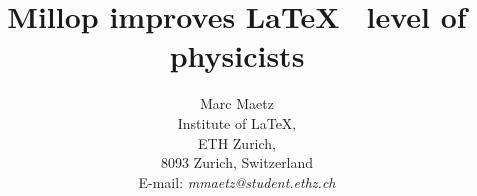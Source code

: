 \documentclass[a5paper]{book}
\title{Millop improves \LaTeX~ level of physicists}
\author{Marc Maetz\\
  Institute of \LaTeX, \\ 
  ETH Zurich,\\
  8093 Zurich, Switzerland\\
  E-mail: {\em mmaetz@student.ethz.ch}}
\begin{document}
 

\maketitle



\tableofcontents 

\begin{thebibliography}{10}
\end{thebibliography} 

  
  

\newpage

\end{document}
